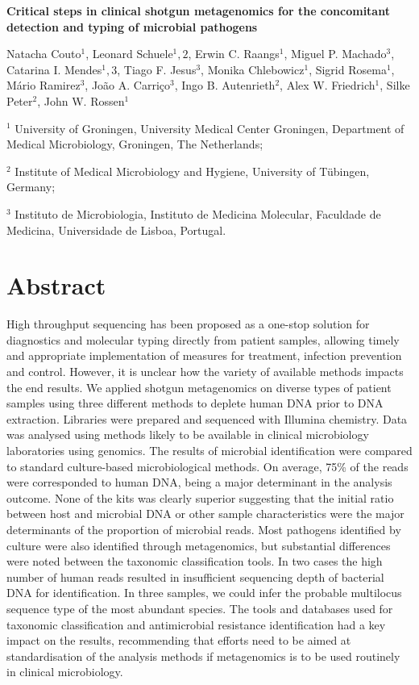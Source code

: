 \cleardoublepage 

\begin{center}
\large
\textbf{Critical steps in clinical shotgun metagenomics for the concomitant detection and typing of microbial pathogens}
\end{center}

Natacha Couto$^1$, 
Leonard Schuele$^1,2$,
Erwin C. Raangs$^1$,
Miguel P. Machado$^3$, 
Catarina I. Mendes$^1,3$,
Tiago F. Jesus$^3$, 
Monika Chlebowicz$^1$, 
Sigrid Rosema$^1$, 
Mário Ramirez$^3$, 
João A. Carriço$^3$, 
Ingo B. Autenrieth$^2$, 
Alex W. Friedrich$^1$, 
Silke Peter$^2$, 
John W. Rossen$^1$

$^1$ University of Groningen, University Medical Center Groningen, Department of Medical Microbiology, Groningen, The Netherlands;

$^2$ Institute of Medical Microbiology and Hygiene, University of Tübingen, Germany; 

$^3$ Instituto de Microbiologia, Instituto de Medicina Molecular, Faculdade de Medicina, Universidade de Lisboa, Portugal.


\section{Abstract} \label{sec:ch2_abstract}

High throughput sequencing has been proposed as a one-stop solution for diagnostics and molecular typing directly from patient samples, allowing timely and appropriate implementation of measures for treatment, infection prevention and control. 
However, it is unclear how the variety of available methods impacts the end results. 
We applied shotgun metagenomics on diverse types of patient samples using three different methods to deplete human DNA prior to DNA extraction.
Libraries were prepared and sequenced with Illumina chemistry. 
Data was analysed using methods likely to be available in clinical microbiology laboratories using genomics. 
The results of microbial identification were compared to standard culture-based microbiological methods. 
On average, 75\% of the reads were corresponded to human DNA, being a major determinant in the analysis outcome. 
None of the kits was clearly superior suggesting that the initial ratio between host and microbial DNA or other sample characteristics were the major determinants of the proportion of microbial reads. 
Most pathogens identified by culture were also identified through metagenomics, but substantial differences were noted between the taxonomic classification tools. 
In two cases the high number of human reads resulted in insufficient sequencing depth of bacterial DNA for identification. 
In three samples, we could infer the probable multilocus sequence type of the most abundant species. 
The tools and databases used for taxonomic classification and antimicrobial resistance identification had a key impact on the results, recommending that efforts need to be aimed at standardisation of the analysis methods if metagenomics is to be used routinely in clinical microbiology.

